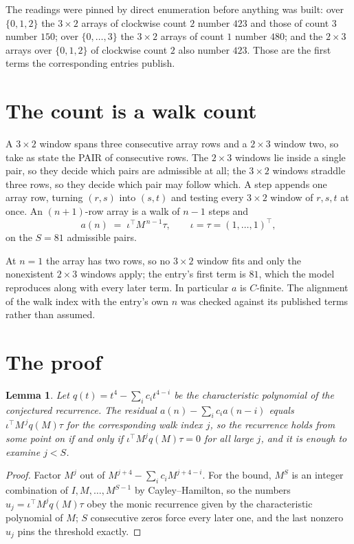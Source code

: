 \documentclass[11pt,a4paper]{article}
\theoremstyle{plain}
\newtheorem{lemma}[theorem]{Lemma}
\theoremstyle{definition}
\begin{document}
The readings were pinned by direct enumeration before anything was built: over
$\{0,1,2\}$ the $3\times2$ arrays of clockwise count $2$ number $423$ and those of count
$3$ number $150$; over $\{0,\dots,3\}$ the $3\times2$ arrays of count $1$ number $480$;
and the $2\times3$ arrays over $\{0,1,2\}$ of clockwise count $2$ also number $423$. Those
are the first terms the corresponding entries publish.

\section{The count is a walk count}

A $3\times2$ window spans three consecutive array rows and a $2\times3$
window two, so take as state the PAIR of consecutive rows. The $2\times3$ windows lie inside a
single pair, so they decide which pairs are admissible at all; the $3\times2$ windows straddle
three rows, so they decide which pair may follow which. A step appends one array row, turning
$(r,s)$ into $(s,t)$ and testing every $3\times2$ window of $r,s,t$ at once. An $(n+1)$-row
array is a walk of $n-1$ steps and
\[
a(n)\;=\;\iota^{\!\top}M^{\,n-1}\tau,\qquad\iota=\tau=(1,\dots,1)^{\!\top},
\]
on the $S=81$ admissible pairs.

At $n=1$ the array has two rows, so no $3\times2$ window fits and only the
nonexistent $2\times3$ windows apply; the entry's first term is
$81$, which the model reproduces along with every later term.
In particular $a$ is $C$-finite. The alignment of the walk index with the entry's own $n$ was
checked against its published terms rather than assumed.

\section{The proof}

\begin{lemma}\label{lem:crit}
Let $q(t)=t^{4}-\sum_i c_it^{4-i}$ be the characteristic polynomial of the
conjectured recurrence. The residual $a(n)-\sum_ic_ia(n-i)$ equals
$\iota^{\!\top}M^{\,j}q(M)\tau$ for the corresponding walk index $j$, so the recurrence
holds from some point on if and only if $\iota^{\!\top}M^{j}q(M)\tau=0$ for all large $j$,
and it is enough to examine $j<S$.
\end{lemma}

\begin{proof}
Factor $M^{j}$ out of $M^{j+4}-\sum_ic_iM^{j+4-i}$. For the bound, $M^{S}$
is an integer combination of $I,M,\dots,M^{S-1}$ by Cayley--Hamilton, so the numbers
$u_j=\iota^{\!\top}M^{j}q(M)\tau$ obey the monic recurrence given by the characteristic
polynomial of $M$; $S$ consecutive zeros force every later one, and the last nonzero $u_j$
pins the threshold exactly.
\end{proof}
\end{document}
